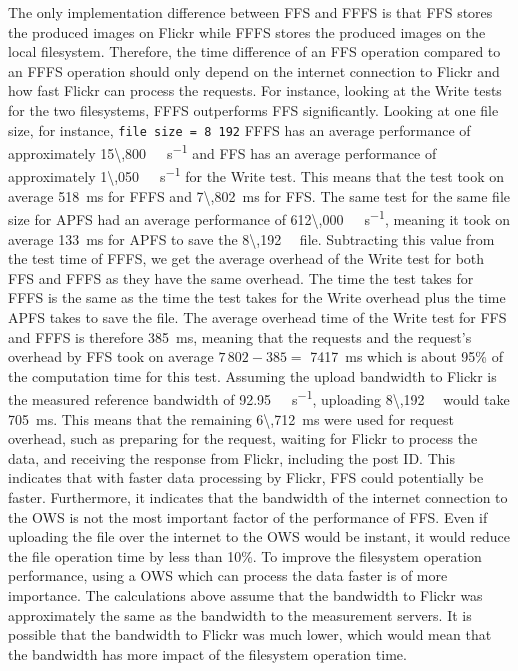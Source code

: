 The only implementation difference between \gls{FFS} and \gls{FFFS} is that \gls{FFS} stores the produced images on Flickr while \gls{FFFS} stores the produced images on the local filesystem. Therefore, the time difference of an \gls{FFS} operation compared to an \gls{FFFS} operation should only depend on the internet connection to Flickr and how fast Flickr can process the requests. For instance, looking at the Write tests for the two filesystems, \gls{FFFS} outperforms \gls{FFS} significantly. Looking at one file size, for instance, \texttt{file size = 8\,192} \gls{FFFS} has an average performance of approximately \SI[per-mode = symbol]{15\,800}{\kilo\byte\per\second} and \gls{FFS} has an average performance of approximately \SI[per-mode = symbol]{1\,050}{\kilo\byte\per\second} for the Write test. This means that the test took on average \SI{518}{\milli\second} for \gls{FFFS} and \SI{7\,802}{\milli\second} for \gls{FFS}. The same test for the same file size for \gls{APFS} had an average performance of \SI[per-mode = symbol]{612\,000}{\kilo\byte\per\second}, meaning it took on average \SI[per-mode = symbol]{133}{\milli\second} for \gls{APFS} to save the \SI[per-mode = symbol]{8\,192}{\kilo\byte} file. Subtracting this value from the test time of \gls{FFFS}, we get the average overhead of the Write test for both \gls{FFS} and \gls{FFFS} as they have the same overhead. The time the test takes for \gls{FFFS} is the same as the time the test takes for the Write overhead plus the time \gls{APFS} takes to save the file. The average overhead time of the Write test for \gls{FFS} and \gls{FFFS} is therefore \SI[per-mode = symbol]{385}{\milli\second}, meaning that the requests and the request's overhead by \gls{FFS} took on average $7\,802 - 385 =$ \SI{7417}{\milli\second} which is about 95\% of the computation time for this test. Assuming the upload bandwidth to Flickr is the measured reference bandwidth of \SI[per-mode = symbol]{92.95}{\mega\byte\per\second}, uploading \SI[per-mode = symbol]{8\,192}{\kilo\byte} would take \SI[per-mode = symbol]{705}{\milli\second}. This means that the remaining \SI[per-mode = symbol]{6\,712}{\milli\second} were used for request overhead, such as preparing for the request, waiting for Flickr to process the data, and receiving the response from Flickr, including the post ID. This indicates that with faster data processing by Flickr, \gls{FFS} could potentially be faster. Furthermore, it indicates that the bandwidth of the internet connection to the \gls{OWS} is not the most important factor of the performance of \gls{FFS}. Even if uploading the file over the internet to the \gls{OWS} would be instant, it would reduce the file operation time by less than 10\%. To improve the filesystem operation performance, using a \gls{OWS} which can process the data faster is of more importance. The calculations above assume that the bandwidth to Flickr was approximately the same as the bandwidth to the measurement servers. It is possible that the bandwidth to Flickr was much lower, which would mean that the bandwidth has more impact of the filesystem operation time.

